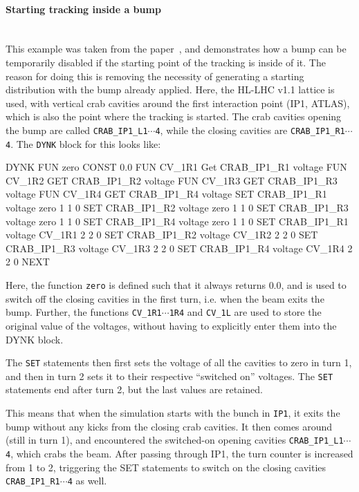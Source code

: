\paragraph{Starting tracking inside a bump}~\\

This example was taken from the paper~\cite{DYNKpaper}, and demonstrates how a bump can be temporarily disabled if the starting point of the tracking is inside of it.
The reason for doing this is removing the necessity of generating a starting distribution with the bump already applied.
Here, the HL-LHC v1.1 lattice is used, with vertical crab cavities around the first interaction point (IP1, ATLAS), which is also the point where the tracking is started.
The crab cavities opening the bump are called \texttt{CRAB\_IP1\_L1$\cdots$4}, while the closing cavities are \texttt{CRAB\_IP1\_R1$\cdots$4}.
The \texttt{DYNK} block for this looks like:
\begin{cverbatim}
DYNK
FUN zero CONST 0.0
FUN CV_1R1 Get CRAB_IP1_R1 voltage
FUN CV_1R2 GET CRAB_IP1_R2 voltage
FUN CV_1R3 GET CRAB_IP1_R3 voltage
FUN CV_1R4 GET CRAB_IP1_R4 voltage
SET CRAB_IP1_R1 voltage zero 1 1 0
SET CRAB_IP1_R2 voltage zero 1 1 0
SET CRAB_IP1_R3 voltage zero 1 1 0
SET CRAB_IP1_R4 voltage zero 1 1 0
SET CRAB_IP1_R1 voltage CV_1R1 2 2 0
SET CRAB_IP1_R2 voltage CV_1R2 2 2 0
SET CRAB_IP1_R3 voltage CV_1R3 2 2 0
SET CRAB_IP1_R4 voltage CV_1R4 2 2 0
NEXT
\end{cverbatim}

Here, the function \texttt{zero} is defined such that it always returns $0.0$, and is used to switch off the closing cavities in the first turn, i.e. when the beam exits the bump.
Further, the functions \texttt{CV\_1R1$\cdots$1R4} and \texttt{CV\_1L} are used to store the original value of the voltages, without having to explicitly enter them into the DYNK block.

The \texttt{SET} statements then first sets the voltage of all the cavities to zero in turn 1, and then in turn 2 sets it to their respective ``switched on'' voltages.
The \texttt{SET} statements end after turn 2, but the last values are retained.

This means that when the simulation starts with the bunch in \texttt{IP1}, it exits the bump without any kicks from the closing crab cavities.
It then comes around (still in turn 1), and encountered the switched-on opening cavities \texttt{CRAB\_IP1\_L1$\cdots$4}, which crabs the beam.
After passing through IP1, the turn counter is increased from 1 to 2, triggering the SET statements to switch on the closing cavities \texttt{CRAB\_IP1\_R1$\cdots$4} as well.

